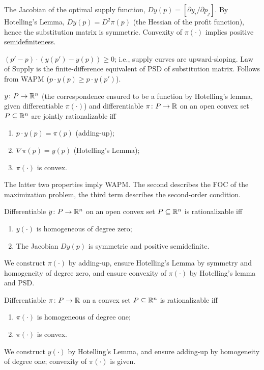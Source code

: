 \documentclass[8pt,letterpaper, landscape]{extarticle} %
\begin{document}
\begin{multicols}{3}
\begin{description}
 The Jacobian of the optimal supply function, $ Dy(p) = [\partial y_i / \partial p_j ] $. By Hotelling's Lemma, $ Dy(p) = D^2 \pi(p) $ (the Hessian of the profit function), hence the substitution matrix is symmetric. Convexity of $ \pi ( \cdot ) $ implies positive semidefiniteness.

 $ (p' - p) \cdot (y(p') - y(p)) \geq 0 $; i.e., supply curves are upward-sloping. Law of Supply is the finite-difference equivalent of PSD of substitution matrix. Follows from WAPM ($ p \cdot y(p) \geq p \cdot y(p') $).

 $ y \colon P \to \mathbb{R}^n $ (the correspondence ensured to be a function by Hotelling's lemma, given differentiable $ \pi (\cdot) $) and differentiable $ \pi \colon P \to \mathbb{R} $ on an open convex set $ P \subseteq \mathbb{R}^n $ are jointly rationalizable iff
\begin{enumerate}
\item $ p\cdot y (p) = \pi(p) $ (adding-up);
\item $ \nabla \pi(p) = y(p) $ (Hotelling's Lemma);
\item $ \pi (\cdot) $ is convex.
\end{enumerate}
The latter two properties imply WAPM. The second describes the FOC of the maximization problem, the third term describes the second-order condition.

 Differentiable $ y \colon P \to \mathbb{R}^n $ on an open convex set $ P \subseteq \mathbb{R}^n $ is rationalizable iff
\begin{enumerate}
\item $ y (\cdot) $ is homogeneous of degree zero;
\item The Jacobian $ Dy(p) $ is symmetric and positive semidefinite.
\end{enumerate}
We construct $ \pi (\cdot) $ by adding-up, ensure Hotelling's Lemma by symmetry and homogeneity of degree zero, and ensure convexity of $ \pi (\cdot) $ by Hotelling's lemma and PSD.

 Differentiable $ \pi \colon P \to \mathbb{R} $ on a convex set $ P \subseteq \mathbb{R}^n $ is rationalizable iff
\begin{enumerate}
\item $ \pi (\cdot) $ is homogeneous of degree one;
\item $ \pi (\cdot) $ is convex.
\end{enumerate}
We construct $ y (\cdot) $ by Hotelling's Lemma, and ensure adding-up by homogeneity of degree one; convexity of $ \pi (\cdot) $ is given.


\end{description}
\end{multicols}
\end{document}
